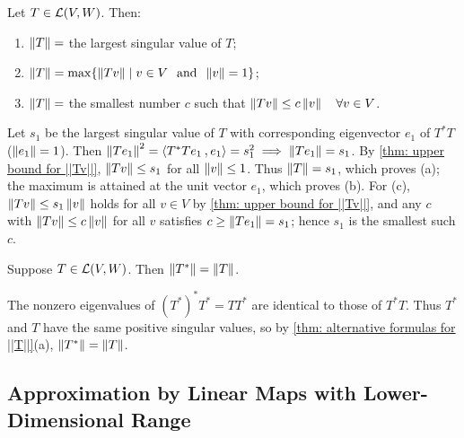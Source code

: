 \begin{thm}
  \label{thm: alternative formulas for ||T||}
  Let $T \in \mathcal{L} (V,W)$. Then:
  \begin{enumerate}[label=\textbf{(\alph*)}]
    \item $\left \lVert T \right \rVert =$ the largest singular value of $T$;
    \item $\left \lVert T \right \rVert = \max\{\left \lVert Tv \right \rVert \mid v \in V \;\;\, \text{and}\;\; \left \lVert v \right \rVert = 1 \}$;
    \item $\left \lVert T \right \rVert =$ the smallest number $c$ such that
    $\left \lVert Tv \right \rVert \leq c \left \lVert v \right \rVert \quad \forall v \in V$.
  \end{enumerate}
\end{thm}
\begin{prf}
  Let $s_1$ be the largest singular value of $T$ with corresponding eigenvector $e_1$ of $T^*T$ ($\left \lVert e_1 \right \rVert = 1$).
  Then $\norm{Te_1}^2 = \ip{T^*Te_1}{e_1} = s_1^2 \implies \norm{Te_1} = s_1$.
  By \ref{thm: upper bound for ||Tv||}, $\left \lVert Tv \right \rVert \leq s_1$ for all $\left \lVert v \right \rVert \leq 1$.
  Thus $\left \lVert T \right \rVert = s_1$, which proves (a); the maximum is attained at the unit vector $e_1$, which proves (b). For (c), $\left \lVert Tv \right \rVert \leq s_1 \left \lVert v \right \rVert$ holds for all $v \in V$ by \ref{thm: upper bound for ||Tv||}, and any $c$ with $\left \lVert Tv \right \rVert \leq c \left \lVert v \right \rVert$ for all $v$ satisfies $c \geq \left \lVert Te_1 \right \rVert = s_1$; hence $s_1$ is the smallest such $c$.
\end{prf}

\begin{thm}
  \label{thm: norm of the adjoint}
  Suppose $T \in \mathcal{L}(V,W)$. Then $\left \lVert T^* \right \rVert = \left \lVert T \right \rVert$.
\end{thm}
\begin{prf}
  The nonzero eigenvalues of $(T^*)^* T^* = TT^*$ are identical to those of $T^*T$.
  Thus $T^*$ and $T$ have the same positive singular values, so by \ref{thm: alternative formulas for ||T||}(a), $\left \lVert T^* \right \rVert = \left \lVert T \right \rVert$.
\end{prf}

\subsection{Approximation by Linear Maps with Lower-Dimensional Range}

